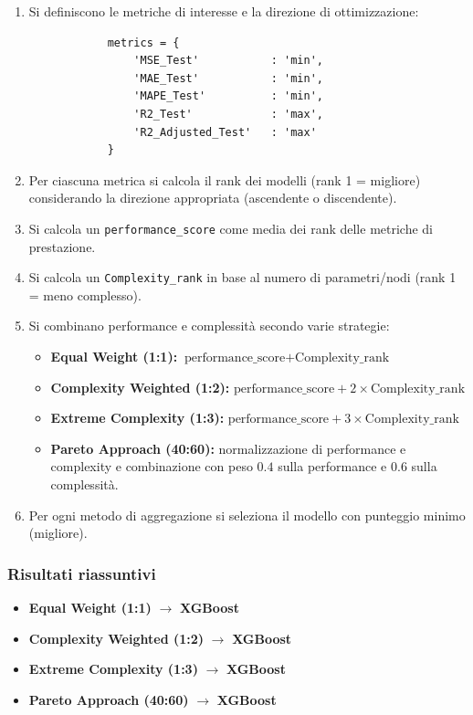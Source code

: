 \documentclass[a4paper,12pt]{report}
\begin{document}
	\begin{enumerate}
		\item Si definiscono le metriche di interesse e la direzione di ottimizzazione:
		\begin{verbatim}
			metrics = {
				'MSE_Test'           : 'min',
				'MAE_Test'           : 'min',
				'MAPE_Test'          : 'min',
				'R2_Test'            : 'max',
				'R2_Adjusted_Test'   : 'max'
			}
		\end{verbatim}
		\item Per ciascuna metrica si calcola il rank dei modelli (rank 1 = migliore) considerando la direzione appropriata (ascendente o discendente).
		\item Si calcola un \texttt{performance\_score} come media dei rank delle metriche di prestazione.
		\item Si calcola un \texttt{Complexity\_rank} in base al numero di parametri/nodi (rank 1 = meno complesso).
		\item Si combinano performance e complessità secondo varie strategie:
		\begin{itemize}
			\item \textbf{Equal Weight (1:1):} \(\text{performance\_score} + \text{Complexity\_rank}\)
			\item \textbf{Complexity Weighted (1:2):} \(\text{performance\_score} + 2 \times \text{Complexity\_rank}\)
			\item \textbf{Extreme Complexity (1:3):} \(\text{performance\_score} + 3 \times \text{Complexity\_rank}\)
			\item \textbf{Pareto Approach (40:60):} normalizzazione di performance e complexity e combinazione con peso \(0.4\) sulla performance e \(0.6\) sulla complessità.
		\end{itemize}
		\item Per ogni metodo di aggregazione si seleziona il modello con punteggio minimo (migliore).
	\end{enumerate}
	
	\subsubsection{Risultati riassuntivi}
	\begin{itemize}
		\item \textbf{Equal Weight (1:1)} \(\rightarrow\) \textbf{XGBoost}
		\item \textbf{Complexity Weighted (1:2)} \(\rightarrow\) \textbf{XGBoost}
		\item \textbf{Extreme Complexity (1:3)} \(\rightarrow\) \textbf{XGBoost}
		\item \textbf{Pareto Approach (40:60)} \(\rightarrow\) \textbf{XGBoost}
	\end{itemize}
	
\end{document}
